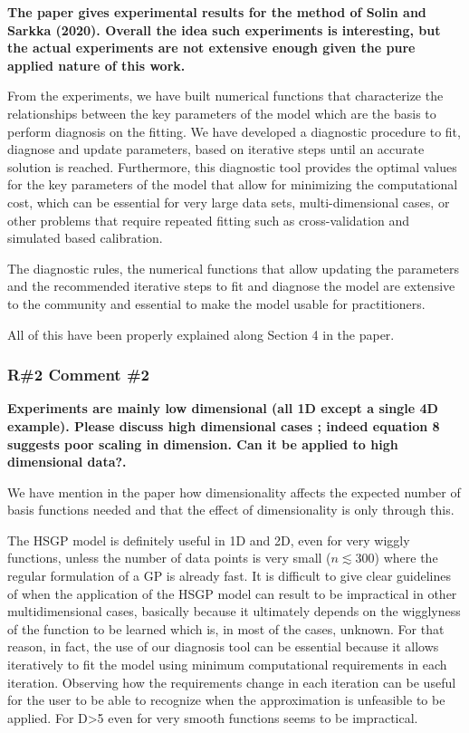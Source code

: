 \documentclass[11pt]{report}
\begin{document}
\textbf{The paper gives experimental results for the method of Solin and Sarkka  (2020). Overall the idea such experiments is interesting, but the actual experiments are not extensive enough given the pure applied nature of this work.}

From the experiments, we have built numerical functions that characterize the relationships between the key parameters of the model which are the basis to perform diagnosis on the fitting. We have developed a diagnostic procedure to fit, diagnose and update parameters, based on iterative steps until an accurate solution is reached. Furthermore, this diagnostic tool provides the optimal values for the key parameters of the model that allow for minimizing the computational cost, which can be essential for very large data sets, multi-dimensional cases, or other problems that require repeated fitting such as cross-validation and simulated based calibration.

The diagnostic rules, the numerical functions that allow updating the parameters and the recommended iterative steps to fit and diagnose the model are extensive to the community and essential to make the model usable for practitioners.

All of this have been properly explained along Section 4 in the paper.

\subsubsection*{R\#2 Comment \#2}

\textbf{Experiments are mainly low dimensional (all 1D except a single 4D example). Please discuss high dimensional cases ; indeed equation 8 suggests poor scaling in dimension. Can it be applied to high dimensional data?.} 

We have mention in the paper how dimensionality affects the expected number of basis functions needed and that the effect of dimensionality is only through this. 

The HSGP model is definitely useful in 1D and 2D, even for very wiggly functions, unless the number of data points is very small ($n \lesssim 300$) where the regular formulation of a GP is already fast. It is difficult to give clear guidelines of when the application of the HSGP model can result to be impractical in other multidimensional cases, basically because it ultimately depends on the wigglyness of the function to be learned which is, in most of the cases, unknown. For that reason, in fact, the use of our diagnosis tool can be essential because it allows iteratively to fit the model using minimum computational requirements in each iteration. Observing how the requirements change in each iteration can be useful for the user to be able to recognize when the approximation is unfeasible to be applied. For D>5 even for very smooth functions seems to be impractical.
\end{document}
